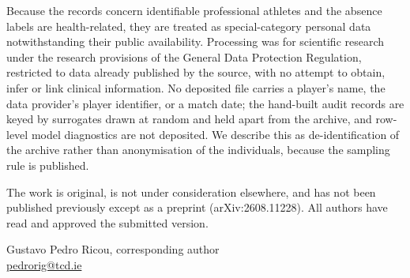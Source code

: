 \documentclass[11pt]{article}
\begin{document}
Because the records concern identifiable professional athletes and the absence
labels are health-related, they are treated as special-category personal data
notwithstanding their public availability. Processing was for scientific
research under the research provisions of the General Data Protection
Regulation, restricted to data already published by the source, with no
attempt to obtain, infer or link clinical information. No deposited file
carries a player's name, the data provider's player identifier, or a match
date; the hand-built audit records are keyed by surrogates drawn at random and
held apart from the archive, and row-level model diagnostics are not
deposited. We describe this as de-identification of the archive rather than
anonymisation of the individuals, because the sampling rule is published.

The work is original, is not under consideration elsewhere, and has not been
published previously except as a preprint (arXiv:2608.11228). All authors have
read and approved the submitted version.

\vspace{1em}

Gustavo Pedro Ricou, corresponding author\\
\href{mailto:pedrorig@tcd.ie}{pedrorig@tcd.ie}
\end{document}
